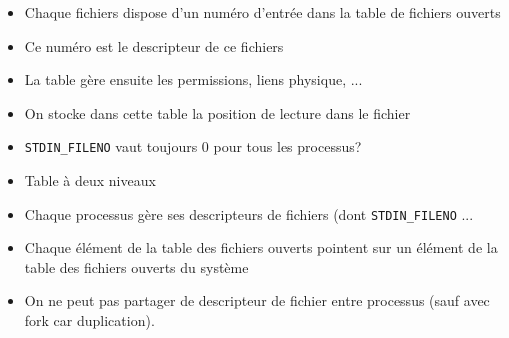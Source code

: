\begin{frame}{\sectitle}
\begin{block}{\subsectitle}
\begin{itemize}
    \item Chaque fichiers dispose d'un numéro d'entrée dans la table de fichiers
    ouverts
    \item Ce numéro est le descripteur de ce fichiers
    \item La table gère ensuite les permissions, liens physique, ...
    \item On stocke dans cette table la position de lecture dans le fichier
\end{itemize}
\end{block}

\begin{exampleblock}{\subsectitle}
\begin{itemize}
    \item \texttt{STDIN\_FILENO} vaut toujours 0 pour tous les processus?
\end{itemize}
\end{exampleblock}

\begin{block}{\subsectitle}
\begin{itemize} 
    \item Table à deux niveaux
    \item Chaque processus gère ses descripteurs de fichiers (dont
    \texttt{STDIN\_FILENO} ...
    \item Chaque élément de la table des fichiers ouverts pointent sur un
    élément de la table des fichiers ouverts du système
    \item On ne peut pas partager de descripteur de fichier entre processus
    (sauf avec fork car duplication).
\end{itemize}
\end{block}
\end{frame}



